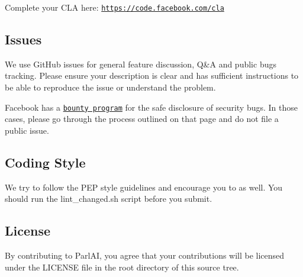 Complete your C\+LA here\+: \href{https://code.facebook.com/cla}{\tt https\+://code.\+facebook.\+com/cla}

\subsection*{Issues}

We use Git\+Hub issues for general feature discussion, Q\&A and public bugs tracking. Please ensure your description is clear and has sufficient instructions to be able to reproduce the issue or understand the problem.

Facebook has a \href{https://www.facebook.com/whitehat/}{\tt bounty program} for the safe disclosure of security bugs. In those cases, please go through the process outlined on that page and do not file a public issue.

\subsection*{Coding Style}

We try to follow the P\+EP style guidelines and encourage you to as well. You should run the {\ttfamily lint\+\_\+changed.\+sh} script before you submit.

\subsection*{License}

By contributing to Parl\+AI, you agree that your contributions will be licensed under the L\+I\+C\+E\+N\+SE file in the root directory of this source tree. 